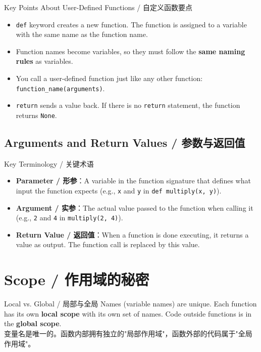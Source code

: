 \documentclass[11pt,a4paper]{report}
\let\oldtexttt\texttt
\renewcommand{\texttt}[1]{\textcolor{mainblue}{\oldtexttt{#1}}}
\begin{document}
\begin{concept}{Key Points About User-Defined Functions / 自定义函数要点}
    \begin{itemize}[itemsep=0.3em]
        \item \texttt{def} keyword creates a new function. The function is assigned to a variable with the same name as the function name.
        \item Function names become variables, so they must follow the \textbf{same naming rules} as variables.
        \item You call a user-defined function just like any other function: \texttt{function\_name(arguments)}.
        \item \texttt{return} sends a value back. If there is no \texttt{return} statement, the function returns \texttt{None}.
    \end{itemize}
\end{concept}

\subsection{Arguments and Return Values / 参数与返回值}

\begin{concept}{Key Terminology / 关键术语}
    \begin{itemize}[itemsep=0.5em]
        \item \textbf{Parameter / 形参}：A variable in the function signature that defines what input the function expects (e.g., \texttt{x} and \texttt{y} in \texttt{def multiply(x, y)}).
        \item \textbf{Argument / 实参}：The actual value passed to the function when calling it (e.g., \texttt{2} and \texttt{4} in \texttt{multiply(2, 4)}).
        \item \textbf{Return Value / 返回值}：When a function is done executing, it returns a value as output. The function call is replaced by this value.
    \end{itemize}
\end{concept}

\section{Scope / 作用域的秘密}

\begin{concept}{Local vs. Global / 局部与全局}
    Names (variable names) are unique. Each function has its own \textbf{local scope} with its own set of names. Code outside functions is in the \textbf{global scope}. \\
    变量名是唯一的。函数内部拥有独立的"局部作用域"，函数外部的代码属于"全局作用域"。
\end{concept}
\end{document}
